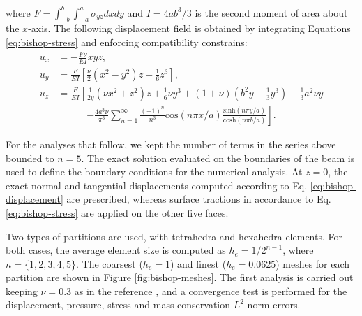 \documentclass[english,11pt,3p,number,sort&compress]{elsarticle}
\begin{document}
\noindent where $F=\int_{-b}^{b}\int_{-a}^{a}\sigma_{yz}dxdy$ and $I=4ab^3/3$ is the second moment of area about the $x$-axis. The following displacement field is obtained by integrating Equations \eqref{eq:bishop-stress} and enforcing compatibility constrains:
\begin{equation} \label{eq:bishop-displacement}
	\begin{split}
		u_x & = -\frac{F\nu}{EI} xyz \text{,}\\
		u_y & = \frac{F}{EI} \left[ \frac{\nu}{2}\left(x^2-y^2\right)z - \frac{1}{6}z^3 \right] \text{,}\\
		u_z & = \frac{F}{EI} \left[ \frac{1}{2y}\left(\nu x^2+z^2\right)z + \frac{1}{6}\nu y^3 +(1+\nu) \left(b^2 y -\frac{1}{3}y^3\right) -\frac{1}{3}a^2 \nu y \right. \\
		&\qquad\quad \left.-\frac{4a^3\nu}{\pi^3} \sum_{n=1}^{\infty} \frac{(-1)^n}{n^3} \text{cos}\left(n\pi x/a\right) \frac{\text{sinh}\left( n\pi y/a \right)}{\text{cosh}\left( n\pi b/a \right)} \right] \text{.}
	\end{split}
\end{equation}

For the analyses that follow, we kept the number of terms in the series above bounded to $n=5$. The exact solution evaluated on the boundaries of the beam is used to define the boundary conditions for the numerical analysis. At $z=0$, the exact normal and tangential displacements computed according to Eq. \eqref{eq:bishop-displacement} are prescribed, whereas surface tractions in accordance to Eq. \eqref{eq:bishop-stress} are applied on the other five faces.

Two types of partitions are used, with tetrahedra and hexahedra elements. For both cases, the average element size is computed as $h_e=1/2^{n-1}$, where $n=\{1,2,3,4,5\}$. The coarsest ($h_e=1$) and finest ($h_e=0.0625$) meshes for each partition are shown in Figure \ref{fig:bishop-meshes}. The first analysis is carried out keeping $\nu=0.3$ as in the reference \cite{bishop2014displacement}, and a convergence test is performed for the displacement, pressure, stress and mass conservation $L^2$-norm errors.
\end{document}
